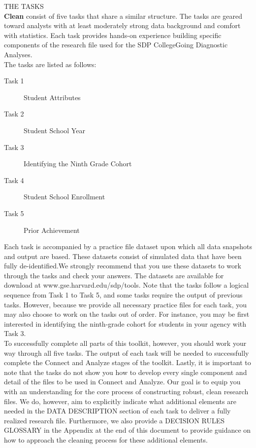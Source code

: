 \documentclass[12pt]{article}
\begin{document}
\noindent \large{THE TASKS} \\
\normalsize
\textbf{Clean} consist of five tasks that share a similar structure.  The tasks are geared toward analysts with at least moderately 
strong data background and comfort with statistics.  Each task provides hands-on experience building specific 
components of the research file used for the SDP CollegeGoing Diagnostic Analyses.  \\

\noindent The tasks are listed as follows:
\begin{description}
\item [Task 1] Student Attributes
\item [Task 2] Student School Year
\item [Task 3] Identifying the Ninth Grade Cohort
\item [Task 4] Student School Enrollment
\item [Task 5] Prior Achievement
\end{description}

Each task is accompanied by a practice file dataset upon which all data snapshots and output are based. These datasets consist of simulated data that have been fully de-identified.We strongly recommend that you use these datasets to work through the tasks and check your answers.  The datasets are available for download at www.gse.harvard.edu/sdp/tools. Note that the tasks follow a logical sequence from Task 1 to Task 5, and some tasks require the output of previous 
tasks.  However, because we provide all necessary practice files for each task, you may also choose to work on the tasks out of order.  For instance, you may be first interested in identifying the ninth-grade cohort for students in your agency with Task 3. \\

To successfully complete all parts of this toolkit, however, you should work your way through all five tasks.  The 
output of each task will be needed to successfully complete the Connect and Analyze stages of the toolkit. 
Lastly, it is important to note that the tasks do not show you how to develop every single component and detail of 
the files to be used in Connect and Analyze.  Our goal is to equip you with an understanding for the core process of 
constructing robust, clean research files.  We do, however, aim to explicitly indicate what additional elements are 
needed in the DATA DESCRIPTION section of each task to deliver a fully realized research file.  Furthermore, we also 
provide a DECISION RULES GLOSSARY in the Appendix at the end of this document to provide guidance on how 
to approach the cleaning process for these additional elements.\\
\end{document}
